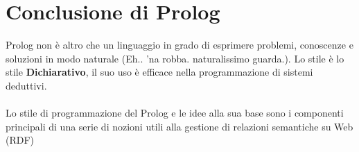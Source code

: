 \documentclass[12pt, a4paper, openany, oneside]{book}
\begin{document}
\chapter{Conclusione di Prolog}
Prolog non è altro che un linguaggio in grado di esprimere problemi, conoscenze
e soluzioni in modo naturale (Eh.. 'na robba. naturalissimo guarda.). Lo stile
è lo stile \textbf{Dichiarativo}, il suo uso è efficace nella programmazione di 
sistemi deduttivi.\\ \\
Lo stile di programmazione del Prolog e le idee alla sua base sono i componenti 
principali di una serie di nozioni utili alla gestione di relazioni semantiche
su Web (RDF)
\end{document}
